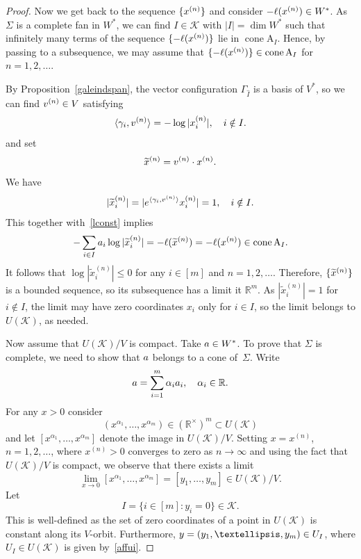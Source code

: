 \documentclass[a4paper]{amsart}
\theoremstyle{definition}
\theoremstyle{remark}
\numberwithin{equation}{section}
\def\R{\mathbb R}
\def\R{\mathbb R}
\def\sK{\mathcal K}
\newcommand{\mb}[1]{{\textbf {\textit#1}}}
\renewcommand{\le}{\leqslant}
\def\cone{\mathop{\mathrm{cone}}}
\newcommand{\<}{\langle}
\renewcommand{\>}{\rangle}
\begin{document}
\begin{proof}
Now we get back to the sequence $\{\mb x^{(n)}\}$ and consider $-\ell(\mb x^{(n)})\in W^*$. As $\Sigma$ is a complete fan in $W^*$, we can find $I\in\sK$ with $|I|=\dim W^*$ such that infinitely many terms of the sequence $\{-\ell(\mb x^{(n)})\}$ lie in $\cone\mathrm A_I$. Hence, by passing to a subsequence, we may assume that
$\{-\ell(\mb x^{(n)})\}\in\cone\mathrm A_I$ for $n=1,2,\ldots$.

By Proposition~\ref{galeindspan}, the vector configuration $\Gamma_{\widehat I}$ is a basis of $V^*$, so we can find $\mb v^{(n)}\in V$ satisfying
$$
   \langle \gamma_i ,\mb v^{(n)}\rangle = -\log|x_{i}^{(n)}|,\quad i \notin I.
$$
and set
\[
  \widetilde{\mb x}^{(n)}=\mb v^{(n)}\cdot{\mb x}^{(n)}.
\]
We have
\[
  |\widetilde x_i^{(n)}| = |e^{\langle \gamma_i,\mb v^{(n)}\rangle} x_i^{(n)}|=1,\quad i\notin I.
\]
This together with~\eqref{lconst} implies
\[
-\sum\limits_{i \in I}\mb a_i \log |\widetilde x_i^{(n)}| =-\ell(\widetilde{\mb x}^{(n)})=  -\ell(\mb x^{(n)}) \in \cone\mathrm A_I.
\]
It follows that $\log |\widetilde x_i^{(n)}|\le0$ for any $i\in[m]$ and $n=1,2,\ldots$. Therefore, 
$\{\widetilde{\mb x}^{(n)}\}$ is a bounded sequence, so its subsequence has a limit it $\R^m$. As $|\widetilde x_i^{(n)}|=1$ for $i\notin I$, the limit may have zero coordinates $x_i$ only for $i\in I$, so the limit belongs to $U(\sK)$, as needed.

\smallskip

Now assume that $U(\sK)/V$ is compact. Take $\mb a\in W^*$. To prove that $\Sigma$ is complete, we need to show that $\mb a$ belongs to a cone of~$\Sigma$. Write 
\begin{equation}\label{aalpha}
  \mb a=\sum_{i=1}^m\alpha_i\mb a_i, \quad \alpha_i\in\R.
\end{equation}
For any $x>0$ consider
\[
  (x^{\alpha_1},\ldots,x^{\alpha_m})\in (\R^\times)^m\subset U(\sK)
\]
and let $[x^{\alpha_1},\ldots,x^{\alpha_m}]$ denote the image in $U(\sK)/V$. Setting $x=x^{(n)}$, $n=1,2,\ldots$, where $x^{(n)}>0$ converges to zero as $n\to\infty$ and using the fact that $U(\sK)/V$ is compact, we observe that there exists a limit
\[
  \lim_{x\to0}[x^{\alpha_1},\ldots,x^{\alpha_m}]=[y_1,\ldots,y_m]\in U(\sK)/V.
\]
Let 
\[
  I=\{i\in[m]\colon y_i=0\}\in\sK.
\]
This is well-defined as the set of zero coordinates of a point in $U(\sK)$ is constant along its $V$-orbit. Furthermore, $\mb y=(y_1,\ldots,y_m)\in U_I$, where $U_I\in U(\sK)$ is given by~\eqref{affui}.


\end{proof}
\end{document}
